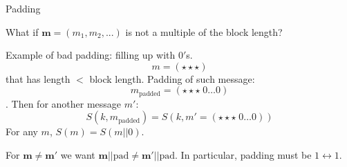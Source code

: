 \documentclass[usenames,dvipsnames, 9pt]{beamer}
\begin{document}
\begin{frame}{Padding}
\Large
\begin{center}
What if $\mathbf{m} = (m_1, m_2, ...)$ is not a multiple of the block length?
\end{center}
Example of {\color{Orange} bad} padding: filling up with $0'$s.
\[m = (\star \star \star  )\] 
that has length $<$ block length. Padding of such message:
\[m_{\text{padded}}=(\star \star \star  \; 0 \ldots 0  ) \]. Then for another message $m'$:
\[S(k,m_{\text{padded}}) = S(k, m'=(\star \star \star  \; 0 \ldots 0  ))\]
For any $m$, $S(m)=S(m||0)$.

\pause
\vspace{10pt}
\LARGE \centering
For $\mathbf{m} \neq \mathbf{m'}$ we want $\mathbf{m}||\text{pad} \neq \mathbf{m'}||\text{pad}$. In particular, padding must be $1 \leftrightarrow 1$.
	
\end{frame}
\end{document}
